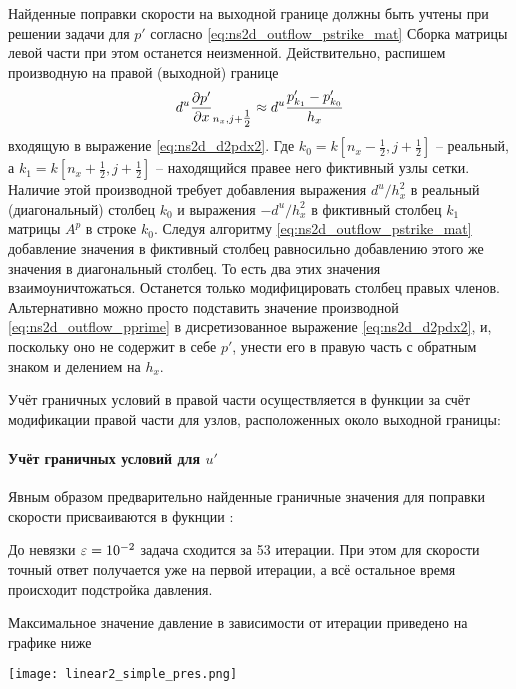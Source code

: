 Найденные поправки скорости на выходной границе
должны быть учтены при решении задачи для $p'$ согласно
\cref{eq:ns2d_outflow_pstrike_mat}
Сборка матрицы левой части при этом останется неизменной.
Действительно, распишем производную на правой (выходной) границе
$$
d^u\frac{\partial p'}{\partial x}_{n_x, j+\tfrac12} \approx d^u\frac{p'_{k_1} - p'_{k_0}}{h_x}
$$
входящую в выражение \cref{eq:ns2d_d2pdx2}.
Где $k_0 = k[n_x - \tfrac12, j+\tfrac12]$ -- реальный,
а $k_1 = k[n_x + \tfrac12, j+\tfrac12]$ -- находящийся правее него фиктивный узлы сетки.
Наличие этой производной требует добавления
выражения $d^u/h_x^2$ в реальный (диагональный) столбец $k_0$
и выражения $-d^u/h_x^2$ в фиктивный столбец $k_1$ матрицы $A^p$ в строке $k_0$.
Следуя алгоритму \cref{eq:ns2d_outflow_pstrike_mat} добавление
значения в фиктивный столбец равносильно добавлению этого же значения в диагональный столбец.
То есть два этих значения взаимоуничтожаться. Останется только модифицировать столбец правых членов.
Альтернативно можно просто подставить значение производной 
\cref{eq:ns2d_outflow_pprime} в дисретизованное выражение 
\cref{eq:ns2d_d2pdx2}, и, поскольку оно не содержит в себе $p'$, унести его в правую часть
с обратным знаком и делением на $h_x$.

Учёт граничных условий в правой части осуществляется в функции
 за счёт модификации правой части для узлов,
расположенных около выходной границы:

\paragraph{Учёт граничных условий для $u'$}
Явным образом предварительно найденные
граничные значения для поправки скорости присваиваются в фукнции
:

До невязки $\varepsilon=10^{-2}$ задача сходится за 53 итерации.
При этом для скорости точный ответ получается уже на первой итерации,
а всё остальное время происходит подстройка давления.

Максимальное значение давление в зависимости от итерации приведено на графике ниже
\begin{center}
\texttt{[image: linear2\_simple\_pres.png]}
\end{center}


